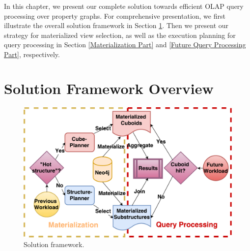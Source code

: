 
In this chapter, we present our complete solution towards efficient OLAP query processing over property graphs. For comprehensive presentation, we first illustrate the overall solution framework in Section \ref{s:4.1}. Then we present our strategy for materialized view selection, as well as the execution planning for query processing in Section \ref{Materialization Part} and \ref{Future Query Processing Part}, respectively.



\section{Solution Framework Overview}
\label{s:4.1}

\begin{figure}[H]
	\centering
	\includegraphics[scale=0.7]{pic/frame.pdf}
	\caption{Solution framework.}
	\label{Solution framework}
\end{figure}

